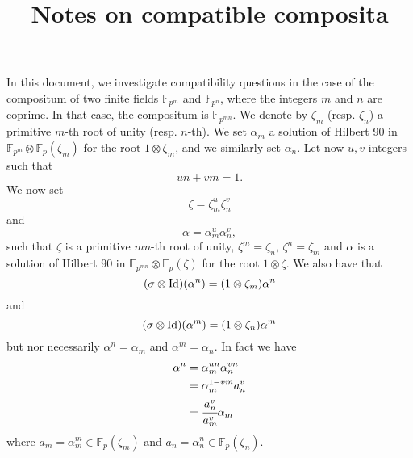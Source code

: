 \documentclass[a4paper,11pt]{article}
\title{Notes on compatible composita}
\author{}
\begin{document}
\maketitle





In this document, we investigate compatibility questions in the case of the
compositum of two finite fields $\mathbb{F}_{p^m}$ and $\mathbb{F}_{p^n}$, where
the integers $m$ and $n$ are coprime. In that case, the compositum is
$\mathbb{F}_{p^{mn}}$. We denote by $\zeta_m$ (resp. $\zeta_n$) a primitive $m$-th 
root of unity (resp. $n$-th). We set $\alpha_m$ a solution of Hilbert 90 in
$\mathbb{F}_{p^m}\otimes\mathbb{F}_{p}(\zeta_m)$ for the root $1\otimes\zeta_m$,
and we similarly set $\alpha_n$. Let now $u, v$ integers such that
\[
  un+vm = 1.
\]
We now set
\[
  \zeta=\zeta_m^u\zeta_n^v
\]
and 
\[
  \alpha=\alpha_m^u\alpha_n^v,
\]
such that $\zeta$ is a primitive $mn$-th root of unity, $\zeta^m=\zeta_n$,
$\zeta^n=\zeta_m$ and $\alpha$ is a
solution of Hilbert 90 in $\mathbb{F}_{p^{mn}}\otimes\mathbb{F}_{p}(\zeta)$ for
the root $1\otimes\zeta$. We also have that
\[
  (\sigma\otimes\operatorname{Id})(\alpha^n) = (1\otimes\zeta_m)\alpha^n
\]
and
\[
  (\sigma\otimes\operatorname{Id})(\alpha^m) = (1\otimes\zeta_n)\alpha^m
\]
but nor necessarily $\alpha^n=\alpha_m$ and $\alpha^m=\alpha_n$. In fact we have 
\begin{align*}
  \alpha^n &= \alpha_m^{un}\alpha_n^{vn} \\
  &= \alpha_m^{1-vm}a_n^v \\
  &= \cfrac{a_n^v}{a_m^v}\alpha_m
\end{align*}
where $a_m=\alpha_m^m\in\mathbb{F}_p(\zeta_m)$ and $a_n =
\alpha_n^n\in\mathbb{F}_p(\zeta_n)$.
\end{document}
